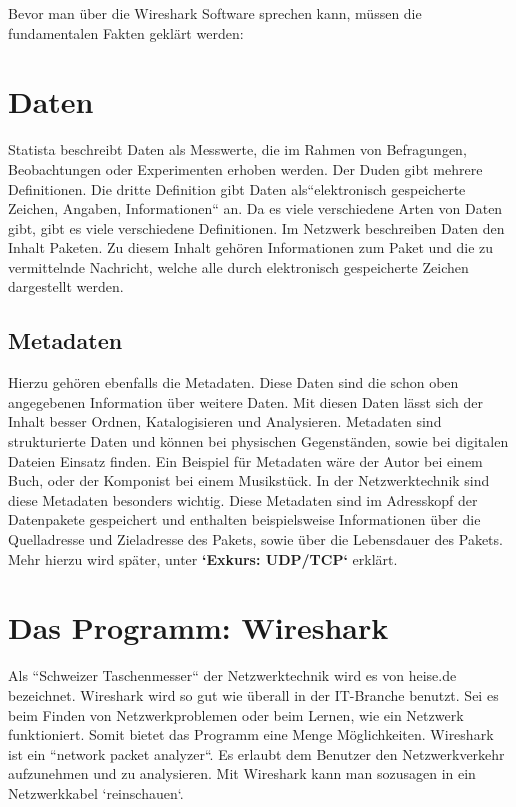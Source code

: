 \documentclass[12pt]{article}
\begin{document}
Bevor man über die Wireshark Software sprechen kann, müssen die fundamentalen Fakten geklärt werden:

\section{Daten}
Statista beschreibt Daten als \glqq Messwerte, die im Rahmen von Befragungen, Beobachtungen oder Experimenten erhoben werden\grqq\cite{statista-daten}. Der Duden gibt mehrere Definitionen. Die dritte Definition gibt Daten als``elektronisch gespeicherte Zeichen, Angaben, Informationen``\cite{duden-daten} an. Da es viele verschiedene Arten von Daten gibt, gibt es viele verschiedene Definitionen. Im Netzwerk beschreiben Daten den Inhalt Paketen. Zu diesem Inhalt gehören Informationen zum Paket und die zu vermittelnde Nachricht, welche alle durch elektronisch gespeicherte Zeichen dargestellt werden.
\subsection{Metadaten}
Hierzu gehören ebenfalls die Metadaten. Diese Daten sind die schon oben angegebenen Information über weitere Daten. Mit diesen Daten lässt sich der Inhalt besser Ordnen, Katalogisieren und Analysieren. Metadaten sind strukturierte Daten und können bei physischen Gegenständen, sowie bei digitalen Dateien Einsatz finden. Ein Beispiel für Metadaten wäre der Autor bei einem Buch, oder der Komponist bei einem Musikstück.\cite{metadaten-security-insider} In der Netzwerktechnik sind diese Metadaten besonders wichtig. Diese Metadaten sind im Adresskopf der Datenpakete gespeichert und enthalten beispielsweise Informationen über die Quelladresse und Zieladresse des Pakets, sowie über die Lebensdauer des Pakets.\cite{tcp+ip-netzwerkecom} Mehr hierzu wird später, unter \textbf{`Exkurs: UDP/TCP`} erklärt.

\section{Das Programm: Wireshark}

Als ``Schweizer Taschenmesser``\cite{schweizer-taschenmesser} der Netzwerktechnik wird es von heise.de bezeichnet. Wireshark wird so gut wie überall in der IT-Branche benutzt. Sei es beim Finden von Netzwerkproblemen oder beim Lernen, wie ein Netzwerk funktioniert. Somit bietet das Programm eine Menge Möglichkeiten. Wireshark ist ein ``network packet analyzer``\cite{what-is-wireshark}. Es erlaubt dem Benutzer den Netzwerkverkehr aufzunehmen und zu analysieren. Mit Wireshark kann man sozusagen in ein Netzwerkkabel `reinschauen`.
\end{document}
